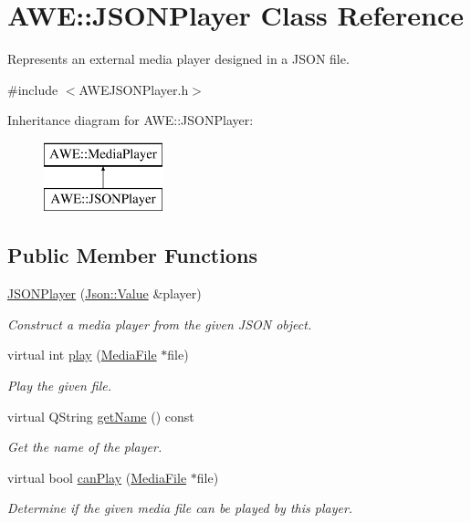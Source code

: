 \hypertarget{class_a_w_e_1_1_j_s_o_n_player}{\section{A\-W\-E\-:\-:J\-S\-O\-N\-Player Class Reference}
\label{class_a_w_e_1_1_j_s_o_n_player}
}


Represents an external media player designed in a J\-S\-O\-N file.  




{\ttfamily \#include $<$A\-W\-E\-J\-S\-O\-N\-Player.\-h$>$}

Inheritance diagram for A\-W\-E\-:\-:J\-S\-O\-N\-Player\-:\begin{figure}[H]
\begin{center}
\leavevmode
\includegraphics[height=2.000000cm]{class_a_w_e_1_1_j_s_o_n_player}
\end{center}
\end{figure}
\subsection*{Public Member Functions}
\begin{DoxyCompactItemize}
\item 
\hyperlink{class_a_w_e_1_1_j_s_o_n_player_a7aceda6a2e246528d952d4b50c0645e0}{J\-S\-O\-N\-Player} (\hyperlink{class_json_1_1_value}{Json\-::\-Value} \&player)
\begin{DoxyCompactList}\small\item\em Construct a media player from the given J\-S\-O\-N object. \end{DoxyCompactList}\item 
virtual int \hyperlink{class_a_w_e_1_1_j_s_o_n_player_a417957c7b0826ecef28b232a2cf9d49e}{play} (\hyperlink{class_a_w_e_1_1_media_file}{Media\-File} $\ast$file)
\begin{DoxyCompactList}\small\item\em Play the given file. \end{DoxyCompactList}\item 
virtual Q\-String \hyperlink{class_a_w_e_1_1_j_s_o_n_player_a9d65a8aa1003452e607ecb481adfb79e}{get\-Name} () const 
\begin{DoxyCompactList}\small\item\em Get the name of the player. \end{DoxyCompactList}\item 
virtual bool \hyperlink{class_a_w_e_1_1_j_s_o_n_player_adba5012e59f5d77f0e08fafeaac017fa}{can\-Play} (\hyperlink{class_a_w_e_1_1_media_file}{Media\-File} $\ast$file)
\begin{DoxyCompactList}\small\item\em Determine if the given media file can be played by this player. \end{DoxyCompactList}\end{DoxyCompactItemize}

